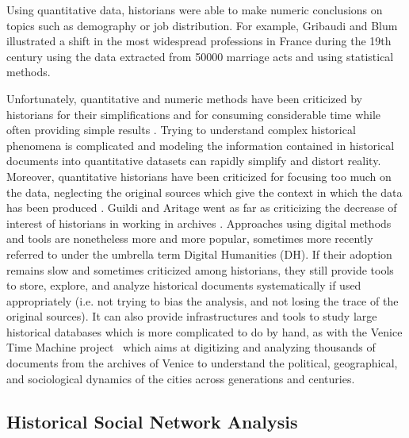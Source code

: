 Using quantitative data, historians were able to make numeric conclusions on topics such as demography \cite{henryRegistresParoissiauxHistoire1956} or job distribution.
For example, Gribaudi and Blum illustrated a shift in the most widespread professions in France during the 19th century using the data extracted from 50000 marriage acts \cite{gribaudi1990} and using statistical methods.

Unfortunately, quantitative and numeric methods have been criticized by historians for their simplifications and for consuming considerable time while often providing simple results \cite{karila-cohenNouvellesCuisinesHistoire2018,lepetitHistoireQuantitativeDeux1989}.
Trying to understand complex historical phenomena is complicated and modeling the information contained in historical documents into quantitative datasets can rapidly simplify and distort reality.
Moreover, quantitative historians have been criticized for focusing too much on the data, neglecting the original sources which give the context in which the data has been produced \cite{lemercierQuantitativeMethodsHumanities2019}.
Guildi and Aritage went as far as criticizing the decrease of interest of historians in working in archives \cite{guldiHistoryManifesto2014}.
Approaches using digital methods and tools are nonetheless more and more popular, sometimes more recently referred to under the umbrella term Digital Humanities (DH).
If their adoption remains slow and sometimes criticized among historians, they still provide tools to store, explore, and analyze historical documents systematically if used appropriately (i.e. not trying to bias the analysis, and not losing the trace of the original sources).
It can also provide infrastructures and tools to study large historical databases which is more complicated to do by hand, as with the Venice Time Machine project~\cite{kaplanVeniceTimeMachine2015} which aims at digitizing and analyzing thousands of documents from the archives of Venice to understand the political, geographical, and sociological dynamics of the cities across generations and centuries.


\subsection{Historical Social Network Analysis}\label{subsec:historical-social-network-analsyis}

